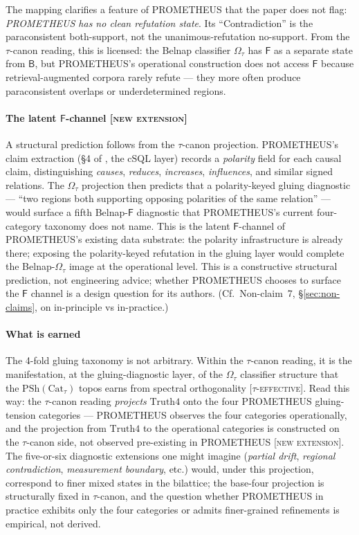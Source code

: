 \documentclass{pantarhei-researchnote}
\newcommand{\NEXT}{\textsc{[new extension]}}
\newcommand{\TEFF}{\textsc{[$\tau$-effective]}}
\newcommand{\Truth}{\ensuremath{\mathrm{Truth4}}}
\newcommand{\Omegatau}{\ensuremath{\Omega_{\tau}}}
\newcommand{\Cattau}{\ensuremath{\mathrm{Cat}_{\tau}}}
\newcommand{\PSh}{\ensuremath{\mathrm{PSh}}}
\begin{document}
The mapping clarifies a feature of PROMETHEUS that the paper does
not flag: \emph{PROMETHEUS has no clean refutation state}. Its
``Contradiction'' is the paraconsistent both-support, not the
unanimous-refutation no-support. From the $\tau$-canon reading, this
is licensed: the Belnap classifier $\Omegatau$ has $\mathsf{F}$ as a
separate state from $\mathsf{B}$, but PROMETHEUS's operational
construction does not access $\mathsf{F}$ because retrieval-augmented
corpora rarely refute --- they more often produce paraconsistent
overlaps or underdetermined regions.

\paragraph{The latent $\mathsf{F}$-channel \NEXT}
A structural prediction follows from the $\tau$-canon projection.
PROMETHEUS's claim extraction (\S4 of \cite{Mahadevan-PROMETHEUS-2026},
the cSQL layer) records a \emph{polarity} field for each causal
claim, distinguishing \emph{causes}, \emph{reduces}, \emph{increases},
\emph{influences}, and similar signed relations. The $\Omegatau$
projection then predicts that a polarity-keyed gluing diagnostic
--- ``two regions both supporting opposing polarities of the same
relation'' --- would surface a fifth Belnap-$\mathsf{F}$ diagnostic
that PROMETHEUS's current four-category taxonomy does not name.
This is the latent $\mathsf{F}$-channel of PROMETHEUS's existing
data substrate: the polarity infrastructure is already there;
exposing the polarity-keyed refutation in the gluing layer would
complete the Belnap-$\Omegatau$ image at the operational level.
This is a constructive structural prediction, not engineering
advice; whether PROMETHEUS chooses to surface the $\mathsf{F}$
channel is a design question for its authors. (Cf.\ Non-claim~7,
\S\ref{sec:non-claims}, on in-principle vs in-practice.)

\paragraph{What is earned}
The 4-fold gluing taxonomy is not arbitrary. Within the
$\tau$-canon reading, it is the manifestation, at the
gluing-diagnostic layer, of the $\Omegatau$ classifier structure
that the $\PSh(\Cattau)$ topos earns from spectral orthogonality
\TEFF. Read this way: the $\tau$-canon reading \emph{projects}
$\Truth$ onto the four PROMETHEUS gluing-tension categories ---
PROMETHEUS observes the four categories operationally, and the
projection from $\Truth$ to the operational categories is
constructed on the $\tau$-canon side, not observed pre-existing in
PROMETHEUS \NEXT. The five-or-six diagnostic extensions one might
imagine (\emph{partial drift}, \emph{regional contradiction},
\emph{measurement boundary}, etc.) would, under this projection,
correspond to finer mixed states in the bilattice; the base-four
projection is structurally fixed in $\tau$-canon, and the question
whether PROMETHEUS in practice exhibits only the four categories or
admits finer-grained refinements is empirical, not derived.
\end{document}
